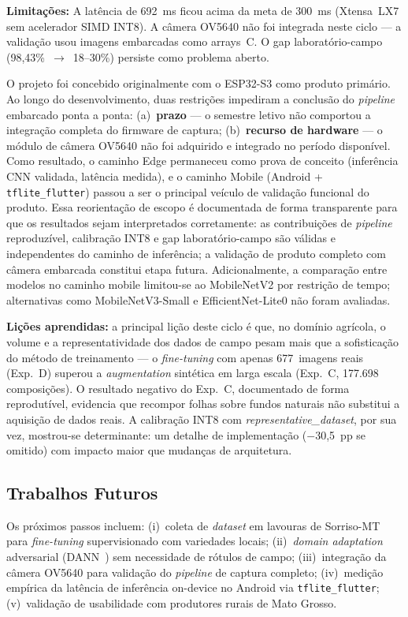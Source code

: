 \documentclass[12pt]{article}
\begin{document}
\textbf{Limitações:} A latência de 692~ms ficou acima da meta de 300~ms
(Xtensa~LX7 sem acelerador SIMD INT8). A câmera OV5640 não foi integrada neste
ciclo --- a validação usou imagens embarcadas como arrays~C. O gap
laboratório-campo (98,43\%~$\to$~18--30\%) persiste como problema aberto.

O projeto foi concebido originalmente com o ESP32-S3 como produto primário.
Ao longo do desenvolvimento, duas restrições impediram a conclusão do
\textit{pipeline} embarcado ponta a ponta: (a)~\textbf{prazo} --- o semestre
letivo não comportou a integração completa do firmware de captura;
(b)~\textbf{recurso de hardware} --- o módulo de câmera OV5640 não foi adquirido
e integrado no período disponível. Como resultado, o caminho Edge permaneceu como
prova de conceito (inferência CNN validada, latência medida), e o caminho Mobile
(Android + \texttt{tflite\_flutter}) passou a ser o principal veículo de
validação funcional do produto. Essa reorientação de escopo é documentada de
forma transparente para que os resultados sejam interpretados corretamente: as
contribuições de \textit{pipeline} reproduzível, calibração INT8 e gap
laboratório-campo são válidas e independentes do caminho de inferência; a
validação de produto completo com câmera embarcada constitui etapa futura.
Adicionalmente, a comparação entre modelos no caminho mobile limitou-se ao
MobileNetV2 por restrição de tempo; alternativas como MobileNetV3-Small e
EfficientNet-Lite0 não foram avaliadas.

\textbf{Lições aprendidas:} a principal lição deste ciclo é que, no domínio
agrícola, o volume e a representatividade dos dados de campo pesam mais que a
sofisticação do método de treinamento --- o \textit{fine-tuning} com apenas
677~imagens reais (Exp.~D) superou a \textit{augmentation} sintética em larga escala
(Exp.~C, 177.698
composições). O resultado negativo do Exp.~C, documentado de forma reprodutível,
evidencia que recompor folhas sobre fundos naturais não substitui a aquisição de
dados reais. A calibração INT8 com \textit{representative\_dataset}, por sua vez,
mostrou-se determinante: um detalhe de implementação ($-$30,5~pp se omitido) com
impacto maior que mudanças de arquitetura.

\subsection{Trabalhos Futuros}

Os próximos passos incluem: (i)~coleta de \textit{dataset} em lavouras de Sorriso-MT
para \textit{fine-tuning} supervisionado com variedades locais; (ii)~\textit{domain
adaptation} adversarial (DANN~\cite{ganin2016}) sem necessidade de rótulos de campo;
(iii)~integração da câmera OV5640 para validação do \textit{pipeline} de captura
completo;
(iv)~medição empírica da latência de inferência on-device no Android via
\texttt{tflite\_flutter}; (v)~validação de usabilidade com produtores rurais de
Mato Grosso.
\end{document}
